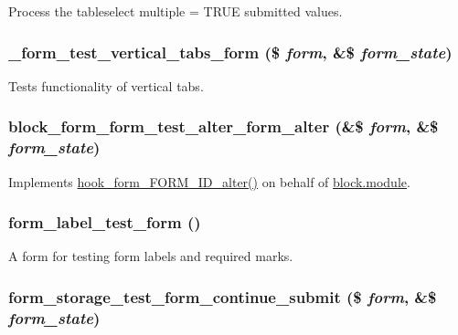 \label{form__test_8module_a21ea4f44b6e6d70424454e54d5d6b994}
Process the tableselect multiple = TRUE submitted values. \hypertarget{form__test_8module_a068c7cb8e05eed176116a6fe654eb935}{
\subsubsection[{\_\-form\_\-test\_\-vertical\_\-tabs\_\-form}]{\setlength{\rightskip}{0pt plus 5cm}\_\-form\_\-test\_\-vertical\_\-tabs\_\-form (\$ {\em form}, \/  \&\$ {\em form\_\-state})}}
\label{form__test_8module_a068c7cb8e05eed176116a6fe654eb935}
Tests functionality of vertical tabs. \hypertarget{form__test_8module_ae941263147dfe0890c35bd5136c58da5}{
\subsubsection[{block\_\-form\_\-form\_\-test\_\-alter\_\-form\_\-alter}]{\setlength{\rightskip}{0pt plus 5cm}block\_\-form\_\-form\_\-test\_\-alter\_\-form\_\-alter (\&\$ {\em form}, \/  \&\$ {\em form\_\-state})}}
\label{form__test_8module_ae941263147dfe0890c35bd5136c58da5}
Implements \hyperlink{group__hooks_ga8d4a4089551493d55911bd5c4f218264}{hook\_\-form\_\-FORM\_\-ID\_\-alter()} on behalf of \hyperlink{block_8module}{block.module}. \hypertarget{form__test_8module_abe4abc920fb6b73d248328d7b4a0bb4d}{
\subsubsection[{form\_\-label\_\-test\_\-form}]{\setlength{\rightskip}{0pt plus 5cm}form\_\-label\_\-test\_\-form ()}}
\label{form__test_8module_abe4abc920fb6b73d248328d7b4a0bb4d}
A form for testing form labels and required marks. \hypertarget{form__test_8module_a14e1121d5bdf2a79e3547f4d30d410b7}{
\subsubsection[{form\_\-storage\_\-test\_\-form\_\-continue\_\-submit}]{\setlength{\rightskip}{0pt plus 5cm}form\_\-storage\_\-test\_\-form\_\-continue\_\-submit (\$ {\em form}, \/  \&\$ {\em form\_\-state})}}
